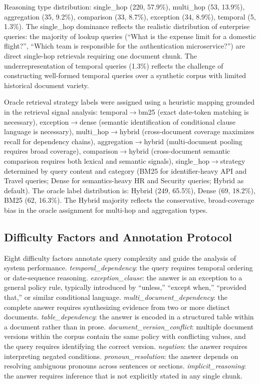\documentclass[11pt, a4paper]{article}
\begin{document}
Reasoning type distribution: single\_hop (220, 57.9\%), multi\_hop (53, 13.9\%), aggregation (35, 9.2\%), comparison (33, 8.7\%), exception (34, 8.9\%), temporal (5, 1.3\%). The single\_hop dominance reflects the realistic distribution of enterprise queries: the majority of lookup queries (``What is the expense limit for a domestic flight?'', ``Which team is responsible for the authentication microservice?'') are direct single-hop retrievals requiring one document chunk. The underrepresentation of temporal queries (1.3\%) reflects the challenge of constructing well-formed temporal queries over a synthetic corpus with limited historical document variety.

Oracle retrieval strategy labels were assigned using a heuristic mapping grounded in the retrieval signal analysis: temporal$\to$bm25 (exact date-token matching is necessary), exception$\to$dense (semantic identification of conditional clause language is necessary), multi\_hop$\to$hybrid (cross-document coverage maximizes recall for dependency chains), aggregation$\to$hybrid (multi-document pooling requires broad coverage), comparison$\to$hybrid (cross-document semantic comparison requires both lexical and semantic signals), single\_hop$\to$strategy determined by query content and category (BM25 for identifier-heavy API and Travel queries; Dense for semantics-heavy HR and Security queries; Hybrid as default). The oracle label distribution is: Hybrid (249, 65.5\%), Dense (69, 18.2\%), BM25 (62, 16.3\%). The Hybrid majority reflects the conservative, broad-coverage bias in the oracle assignment for multi-hop and aggregation types.

\subsection{Difficulty Factors and Annotation Protocol}

Eight difficulty factors annotate query complexity and guide the analysis of system performance. \emph{temporal\_dependency}: the query requires temporal ordering or date-sequence reasoning. \emph{exception\_clause}: the answer is an exception to a general policy rule, typically introduced by ``unless,'' ``except when,'' ``provided that,'' or similar conditional language. \emph{multi\_document\_dependency}: the complete answer requires synthesizing evidence from two or more distinct documents. \emph{table\_dependency}: the answer is encoded in a structured table within a document rather than in prose. \emph{document\_version\_conflict}: multiple document versions within the corpus contain the same policy with conflicting values, and the query requires identifying the correct version. \emph{negation}: the answer requires interpreting negated conditions. \emph{pronoun\_resolution}: the answer depends on resolving ambiguous pronouns across sentences or sections. \emph{implicit\_reasoning}: the answer requires inference that is not explicitly stated in any single chunk.
\end{document}
